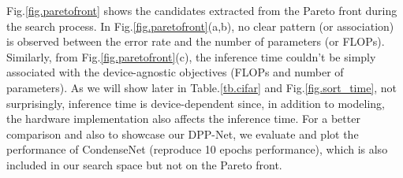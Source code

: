 \documentclass[runningheads]{llncs}
\begin{document}
Fig.\ref{fig.paretofront} shows the candidates extracted from the Pareto front during the search process. In Fig.\ref{fig.paretofront}(a,b), no clear pattern (or association) is observed between the error rate and the number of parameters (or FLOPs). Similarly, from Fig.\ref{fig.paretofront}(c), the inference time couldn't be simply associated with the device-agnostic objectives (FLOPs and number of parameters). As we will show later in Table.\ref{tb.cifar} and Fig.\ref{fig.sort_time}, not surprisingly, inference time is device-dependent since, in addition to modeling, the hardware implementation also affects the inference time. For a better comparison and also to showcase our DPP-Net, we evaluate and plot the performance of CondenseNet (reproduce 10 epochs performance), which is also included in our search space but not on the Pareto front.
\end{document}
